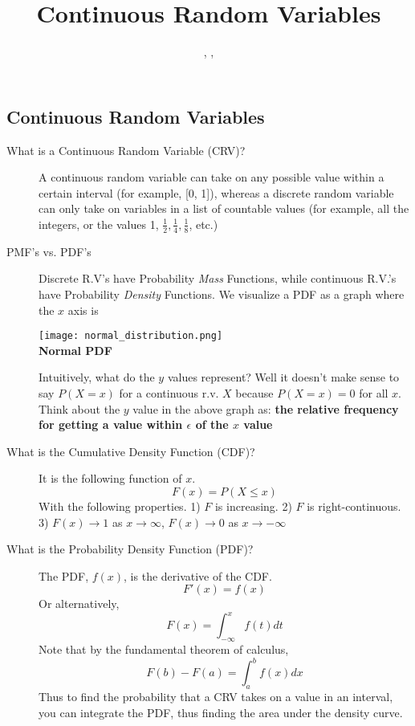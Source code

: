 \documentclass[11.5pt]{article}
\title{Continuous Random Variables}
\author{\shira, \tim, \creds}
\begin{document}
\maketitle

\begin{notes}
\section*{Continuous Random Variables}

\begin{description}
\item[What is a Continuous Random Variable (CRV)?] A continuous random variable can take on any possible value within a certain interval (for example, [0, 1]), whereas a discrete random variable can only take on variables in a list of countable values (for example, all the integers, or the values 1, $\frac{1}{2}, \frac{1}{4}, \frac{1}{8}$, etc.)
\item[PMF's vs. PDF's] Discrete R.V's have Probability \textit{Mass} Functions, while continuous R.V.'s have Probability \textit{Density} Functions. We visualize a PDF as a graph where the $x$ axis is
\begin{center}
\texttt{[image: normal\_distribution.png]}\\ 
\textbf{Normal PDF}
\end{center}

Intuitively, what do the $y$ values represent? Well it doesn't make sense to say $P(X = x)$ for a continuous r.v. $X$ because $P(X = x) = 0$ for all $x$. Think about the $y$ value in the above graph as: \textbf{the relative frequency for getting a value within $\epsilon$ of the $x$ value}
\item[What is the Cumulative Density Function (CDF)?] It is the following function of $x$.
		\[F(x) = P(X \leq x)\]
		With the following properties. 1) $F$ is increasing. 2) $F$ is right-continuous. 3) $F(x) \rightarrow 1$ as $x \rightarrow \infty$, $F(x) \rightarrow 0$ as $x \rightarrow -\infty$

\item[What is the Probability Density Function (PDF)?] The PDF, $f(x)$, is the derivative of the CDF. 
\[ F'(x) = f(x) \]
Or alternatively,
\[ F(x) = \int_{-\infty}^x f(t)dt \]
Note that by the fundamental theorem of calculus,
\[ F(b) - F(a) = \int^b_a f(x)dx \]
Thus to find the probability that a CRV takes on a value in an interval, you can integrate the PDF, thus finding the area under the density curve.


\end{description}
\end{notes}
\end{document}
